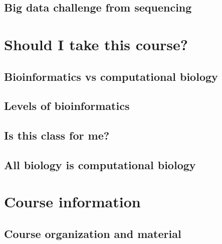 \documentclass[]{book}
\begin{document}
\hypertarget{big-data-challenge-from-sequencing}{%
\subsection{Big data challenge from sequencing}\label{big-data-challenge-from-sequencing}}

\hypertarget{should-i-take-this-course}{%
\section{Should I take this course?}\label{should-i-take-this-course}}

\hypertarget{bioinformatics-vs-computational-biology}{%
\subsection{Bioinformatics vs computational biology}\label{bioinformatics-vs-computational-biology}}

\hypertarget{levels-of-bioinformatics}{%
\subsection{Levels of bioinformatics}\label{levels-of-bioinformatics}}

\hypertarget{is-this-class-for-me}{%
\subsection{Is this class for me?}\label{is-this-class-for-me}}

\hypertarget{all-biology-is-computational-biology}{%
\subsection{All biology is computational biology}\label{all-biology-is-computational-biology}}

\hypertarget{course-information-1}{%
\section{Course information}\label{course-information-1}}

\hypertarget{course-organization-and-material}{%
\subsection{Course organization and material}\label{course-organization-and-material}}
\end{document}
